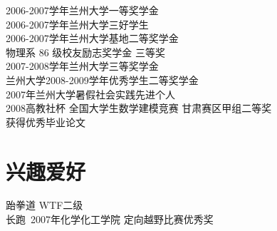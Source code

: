 \documentclass{res}
\begin{document}
\begin{CJK}{UTF8}{gbsn}
\begin{resume}
    2006-2007学年兰州大学一等奖学金\\
    2006-2007学年兰州大学三好学生\\
    2006-2007学年兰州大学基地二等奖学金\\
    物理系 86 级校友励志奖学金 三等奖\\
    2007-2008学年兰州大学三等奖学金\\
    兰州大学2008-2009学年优秀学生二等奖学金\\
    2007年兰州大学暑假社会实践先进个人\\
    2008高教社杯 全国大学生数学建模竞赛 甘肃赛区甲组二等奖\\
    获得优秀毕业论文
      
\section{兴趣爱好}          
    跆拳道 WTF二级\\
   长跑\quad\,  2007年化学化工学院 定向越野比赛优秀奖          
 
\end{resume}
\end{CJK}
\end{document}
